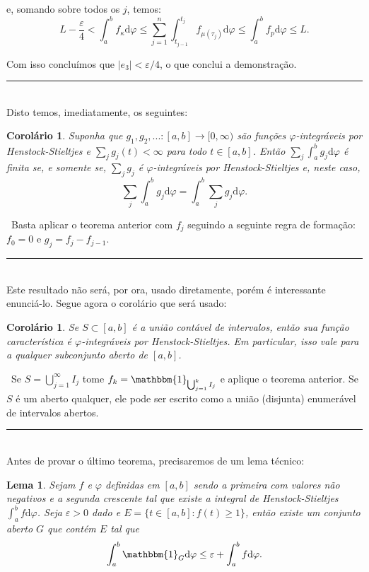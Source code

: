 \documentclass[12pt, a4paper]{article}
\newtheorem{lem}[mydef]{Lema}
\newtheorem{cor}[mydef]{Corolário}
\def\dem{\par\smallbreak\noindent {\textit{ Demonstração:}} \ }
\def\eop{\hfill\rule{2.5mm}{2.5mm}}
\theoremstyle{definition}
\begin{document}
e, somando sobre todos os $j$, temos: $$L-\frac{\varepsilon}{4} < \int_a^b f_\kappa  \text{d}\varphi  \leq \sum_{j=1}^n \int_{t_{j-1}}^{t_j}f_{\mu(\tau_j)} \text{d}\varphi \leq \int_a^bf_p  \text{d}\varphi \leq L. $$ 

Com isso concluímos que $|e_3|<\varepsilon / 4$, o que conclui a demonstração. \eop \\ 


Disto temos, imediatamente, os seguintes: 

\begin{cor}
	
	Suponha que $g_1,g_2,...:[a,b]\rightarrow [0,\infty)$ são funções $\varphi$-integráveis por Henstock-Stieltjes e $\sum_j g_j(t)<\infty$ para todo $t\in[a,b]$. Então $\sum_j \int_a^b g_j  \text{d}\varphi$ é finita se, e somente se, $\sum_j g_j$ é  $\varphi$-integráveis por Henstock-Stieltjes e, neste caso, $$\sum_j \int_a^b g_j  \text{d}\varphi = \int_a^b \sum_j g_j  \text{d}\varphi.$$
	
\end{cor}

\dem Basta aplicar o teorema anterior com $f_j$ seguindo a seguinte regra de formação: $f_0=0$ e $g_j=f_j-f_{j-1}$. \eop \\

Este resultado não será, por ora, usado diretamente, porém é interessante enunciá-lo. Segue agora o corolário que será usado:

\begin{cor}
	
	 Se $S\subset [a,b]$ é a união contável de intervalos, então sua função característica é $\varphi$-integráveis por Henstock-Stieltjes. Em particular, isso vale para a qualquer subconjunto aberto de $[a,b]$.
	
\end{cor}

\dem Se $S=\bigcup_{j=1}^\infty I_j$ tome $f_k= \mathbbm{1}_{\bigcup_{j=1}^k I_j}$ e aplique o teorema anterior. Se $S$ é um aberto qualquer, ele pode ser escrito como a união (disjunta) enumerável de intervalos abertos. \eop \\


Antes de provar o último teorema, precisaremos de um lema técnico:

\begin{lem}
	
	Sejam $f$ e $\varphi$ definidas em $[a,b]$ sendo a primeira com valores não negativos e a segunda crescente tal que existe a integral de Henstock-Stieltjes $\int_a^b f  \text{d}\varphi$. Seja $\varepsilon >0$ dado e $E=\{ t\in [a,b]:f(t)\geq 1 \}$, então existe um conjunto aberto $G$ que contém $E$ tal que $$\int_a^b  \mathbbm{1}_G  \text{d}\varphi \leq \varepsilon + \int_a^b  f  \text{d}\varphi .$$
	
\end{lem}
\end{document}
